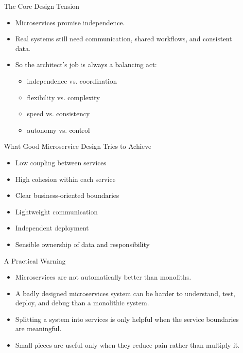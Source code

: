 \begin{frame}{The Core Design Tension}
\begin{itemize}
    \item Microservices promise independence.
    \item Real systems still need communication, shared workflows, and consistent data.
    \item So the architect's job is always a balancing act:
    \begin{itemize}
        \item independence vs. coordination
        \item flexibility vs. complexity
        \item speed vs. consistency
        \item autonomy vs. control
    \end{itemize}
\end{itemize}
\end{frame}

\begin{frame}{What Good Microservice Design Tries to Achieve}
\begin{itemize}
    \item Low coupling between services
    \item High cohesion within each service
    \item Clear business-oriented boundaries
    \item Lightweight communication
    \item Independent deployment
    \item Sensible ownership of data and responsibility
\end{itemize}
\end{frame}

\begin{frame}{A Practical Warning}
\begin{itemize}
    \item Microservices are not automatically better than monoliths.
    \item A badly designed microservices system can be harder to understand, test, deploy, and debug than a monolithic system.
    \item Splitting a system into services is only helpful when the service boundaries are meaningful.
    \item Small pieces are useful only when they reduce pain rather than multiply it.
\end{itemize}
\end{frame}

